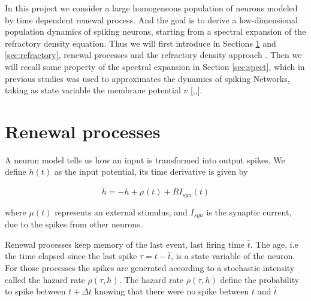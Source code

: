 \documentclass[12pt,twoside]{report}
\begin{document}
In this project we consider a large homogeneous population of neurons modeled by time dependent renewal process. And the goal is to derive a low-dimensional population dynamics of spiking neurons, starting from a spectral expansion of the refractory density equation. Thus we will first introduce in Sections \ref{sec:renew} and \ref{sec:refractory}, renewal processes and the refractory density approach . Then we will recall some property of the spectral expansion in Section \ref{sec:spect}, which in previous studies was used to approximates the dynamics of spiking Networks, taking as state variable the membrane potential $v$ [\cite{MatGiu02},\cite{SchOst13},\cite{AugLad17}].







\section{Renewal processes} %
\label{sec:renew}




A neuron model tells us how an input is transformed into output spikes. We define $h(t)$ as the input potential, its time derivative is given by

\begin{equation}
\dot{h}=-h+\mu(t) +RI_{syn}(t)
\end{equation}

where $\mu(t)$ represents an external stimulus, and $I_{syn}$ is the synaptic current, due to the spikes from other neurons.


Renewal processes keep memory of the last event, last firing time $\hat{t}$. The age, i.e the time elapsed since the last spike $\tau=t-\hat{t}$, is a state variable of the neuron. For those processes the spikes are generated according to a stochastic intensity called the hazard rate $\rho(\tau,h)$. The hazard rate $\rho(\tau,h)$ define the probability to spike between $t+\Delta t$ knowing that there were no spike between $t$ and $\hat{t}$
\end{document}
